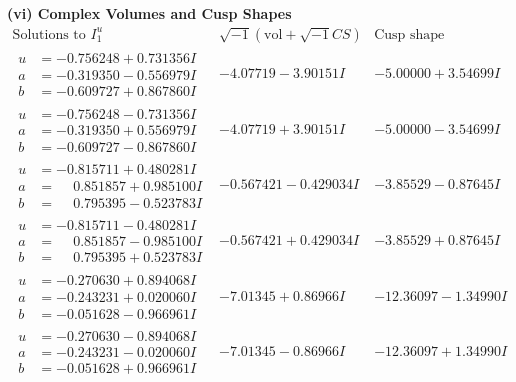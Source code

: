 \documentclass[1p]{elsarticle_modified}
\theoremstyle{definition}
\newcommand{\I}{\sqrt{-1}}
\begin{document}
\newpage\flushleft \textbf{(vi) Complex Volumes and Cusp Shapes}
$$\begin{array}{c|c|c}  
\text{Solutions to }I^u_{1}& \I (\text{vol} + \sqrt{-1}CS) & \text{Cusp shape}\\
 \hline 
\begin{aligned}
u &= -0.756248 + 0.731356 I \\
a &= -0.319350 - 0.556979 I \\
b &= -0.609727 + 0.867860 I\end{aligned}
 & -4.07719 - 3.90151 I & -5.00000 + 3.54699 I \\ \hline\begin{aligned}
u &= -0.756248 - 0.731356 I \\
a &= -0.319350 + 0.556979 I \\
b &= -0.609727 - 0.867860 I\end{aligned}
 & -4.07719 + 3.90151 I & -5.00000 - 3.54699 I \\ \hline\begin{aligned}
u &= -0.815711 + 0.480281 I \\
a &= \phantom{-}0.851857 + 0.985100 I \\
b &= \phantom{-}0.795395 - 0.523783 I\end{aligned}
 & -0.567421 - 0.429034 I & -3.85529 - 0.87645 I \\ \hline\begin{aligned}
u &= -0.815711 - 0.480281 I \\
a &= \phantom{-}0.851857 - 0.985100 I \\
b &= \phantom{-}0.795395 + 0.523783 I\end{aligned}
 & -0.567421 + 0.429034 I & -3.85529 + 0.87645 I \\ \hline\begin{aligned}
u &= -0.270630 + 0.894068 I \\
a &= -0.243231 + 0.020060 I \\
b &= -0.051628 - 0.966961 I\end{aligned}
 & -7.01345 + 0.86966 I & -12.36097 - 1.34990 I \\ \hline\begin{aligned}
u &= -0.270630 - 0.894068 I \\
a &= -0.243231 - 0.020060 I \\
b &= -0.051628 + 0.966961 I\end{aligned}
 & -7.01345 - 0.86966 I & -12.36097 + 1.34990 I \\ \hline\begin{aligned}

\end{aligned}
\end{array}$$
\end{document}
